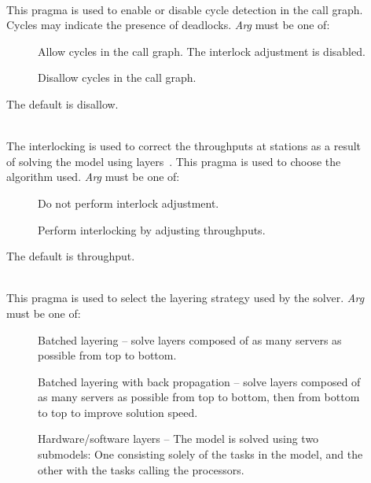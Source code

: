 \begin{description}
\item[]~\\
This pragma is used to enable or disable cycle detection in the call
graph.  Cycles may indicate the presence of deadlocks.
\emph{Arg} must be one of: 
\begin{description}
\item[]
Allow cycles in the call graph.  The interlock adjustment is disabled.
\item[]
Disallow cycles in the call graph.
\end{description}
The default is disallow.
\item[]~\\
The interlocking is used to correct the throughputs at stations as a
result of solving the model using layers~\cite{perf:franks-95-ipds-interlock}.  This pragma is used to
choose the algorithm used.
\emph{Arg} must be one of: 
\begin{description}
\item[]
Do not perform interlock adjustment.
\item[]
Perform interlocking by adjusting throughputs.
\end{description}
The default is throughput.
\item[]~\\
This pragma is used to select the layering strategy used by the solver.
\emph{Arg} must be one of: 
\begin{description}
\item[]
Batched layering -- solve layers composed of as many servers as possible from top to bottom.
\item[]
Batched layering with back propagation -- solve layers composed of as many servers as possible from top to bottom, then from bottom to top to improve solution speed.
\item[]
Hardware/software layers -- The model is solved using two submodels:
One consisting solely of the tasks in the model, and the other with the tasks calling the processors.
\item[]

\end{description}
\end{description}
